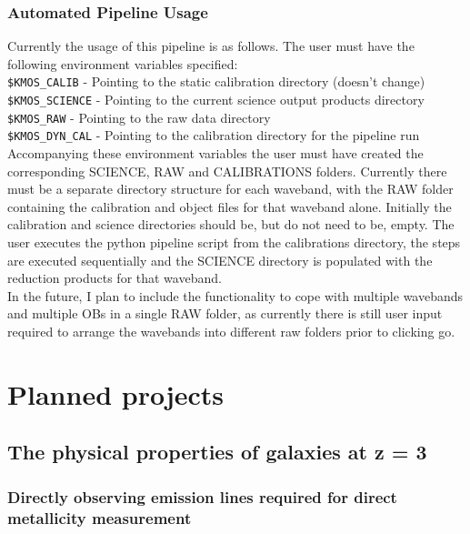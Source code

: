 \documentclass{literature}
\begin{document}
\subsubsection{Automated Pipeline Usage}
Currently the usage of this pipeline is as follows. The user must have the following environment variables specified: \\ 

\noindent
{\tt{\$KMOS\_CALIB}} - Pointing to the static calibration directory (doesn't change) \\
\noindent
{\tt{\$KMOS\_SCIENCE}} - Pointing to the current science output products directory \\
\noindent
{\tt{\$KMOS\_RAW}} - Pointing to the raw data directory \\
\noindent
{\tt{\$KMOS\_DYN\_CAL}} - Pointing to the calibration directory for the pipeline run \\

\noindent
Accompanying these environment variables the user must have created the corresponding SCIENCE, RAW and CALIBRATIONS folders. Currently there must be a separate directory structure for each waveband, with the RAW folder containing the calibration and object files for that waveband alone. Initially the calibration and science directories should be, but do not need to be, empty. The user executes the python pipeline script from the calibrations directory, the steps are executed sequentially and the SCIENCE directory is populated with the reduction products for that waveband. \\
In the future, I plan to include the functionality to cope with multiple wavebands and multiple OBs in a single RAW folder, as currently there is still user input required to arrange the wavebands into different raw folders prior to clicking go.   



\section{Planned projects}\label{sec:projects}
\subsection{The physical properties of galaxies at z = 3}\label{subsec:redshift_three_sample}

\subsubsection{Directly observing emission lines required for direct metallicity measurement}
\end{document}
